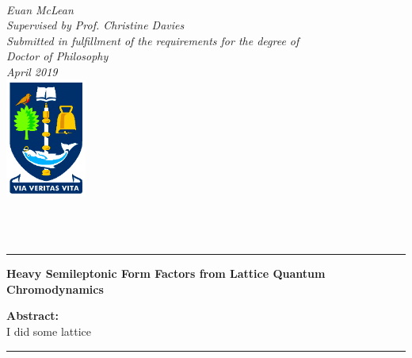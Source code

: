 \begin{titlepage}
\begin{center}
\vspace*{0.8cm}
 \\
\vspace*{0.5cm}
\noindent \LARGE \emph{Euan McLean} \\
\vspace*{1.3cm}
\noindent \large \emph{Supervised by Prof. Christine Davies} \\
\vspace*{0.8cm}
\noindent \large \emph{Submitted in fulfillment of the requirements for the degree of} \\
\vspace*{0.1cm}
\noindent \large \emph{Doctor of Philosophy} \\
\vspace*{0.8cm}
\noindent \large \emph{April 2019} \\
\vspace*{1.3cm}
\includegraphics[width=100px]{images/logo-glasgow-small.png}

\vspace*{0.3cm}

 \\
 \\


\end{center}

\cleardoublepage
\begin{vcenterpage}
\noindent\rule[2pt]{\textwidth}{0.5pt}
\begin{center}
{\large\textbf{Heavy Semileptonic Form Factors from Lattice Quantum Chromodynamics}}
\end{center}
{\large\textbf{Abstract:}}
\\
I did some lattice
\\
\noindent\rule[2pt]{\textwidth}{0.5pt}
\end{vcenterpage}


\end{titlepage}
